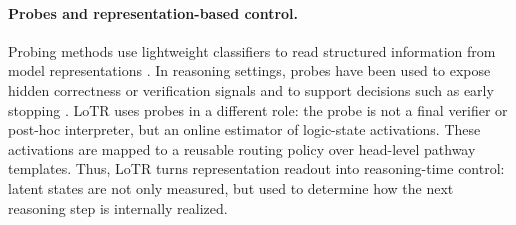 \paragraph{Probes and representation-based control.}
Probing methods use lightweight classifiers to read structured information from model representations \citep{alain2016understanding,belinkov2022probes}. In reasoning settings, probes have been used to expose hidden correctness or verification signals and to support decisions such as early stopping \citep{zhang2025reasoningmodels}. LoTR uses probes in a different role: the probe is not a final verifier or post-hoc interpreter, but an online estimator of logic-state activations. These activations are mapped to a reusable routing policy over head-level pathway templates. Thus, LoTR turns representation readout into reasoning-time control: latent states are not only measured, but used to determine how the next reasoning step is internally realized.
\vspace{-1mm}